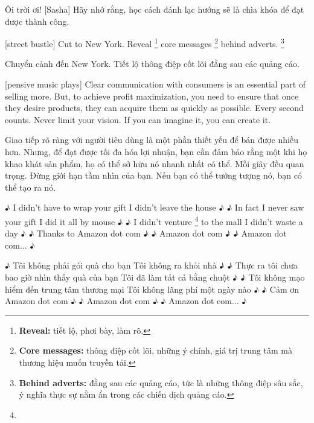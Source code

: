 \documentclass[a4paper]{article}
\begin{document}
	\begin{vietnamese-v2}
		 Ôi trời ơi! 
		[Sasha] Hãy nhớ rằng, học cách đánh lạc hướng sẽ là chìa khóa để đạt được thành công.
	\end{vietnamese-v2}
	
	
	[street bustle]
	Cut to New York. Reveal \footnote{
		\textbf{Reveal:} tiết lộ, phơi bày, làm rõ.
	
	} core messages \footnote{
		\textbf{Core messages:} thông điệp cốt lõi, những ý chính, giá trị trung tâm mà thương hiệu muốn truyền tải.
	
	} behind adverts. \footnote{
		\textbf{Behind adverts:} đằng sau các quảng cáo, tức là những thông điệp sâu sắc, ý nghĩa thực sự nằm ẩn trong các chiến dịch quảng cáo.
	
	}
	
	\begin{vietnamese-v2}
		Chuyển cảnh đến New York. Tiết lộ thông điệp cốt lõi đằng sau các quảng cáo.
	\end{vietnamese-v2}
	
	[pensive music plays]
	Clear communication with consumers is an essential part of selling more. But, to achieve profit maximization, you need to ensure that once they desire products, they can acquire them as quickly as possible.
	Every second counts.
	Never limit your vision.
	If you can imagine it, you can create it.
	
	\begin{vietnamese-v2}
		 Giao tiếp rõ ràng với người tiêu dùng là một phần thiết yếu để bán được nhiều hơn. Nhưng, để đạt được tối đa hóa lợi nhuận, bạn cần đảm bảo rằng một khi họ khao khát sản phẩm, họ có thể sở hữu nó nhanh nhất có thể. 
		Mỗi giây đều quan trọng. 
		Đừng giới hạn tầm nhìn của bạn. 
		Nếu bạn có thể tưởng tượng nó, bạn có thể tạo ra nó.
	\end{vietnamese-v2}
	
	
	♪ I didn't have to wrap your gift I didn't leave the house ♪
	♪ In fact I never saw your gift I did it all by mouse ♪
	♪ I didn't venture  \footnote{} to the mall I didn't waste a day ♪
	♪ Thanks to Amazon dot com ♪
	♪ Amazon dot com ♪
	♪ Amazon dot com... ♪
	
	\begin{vietnamese-v2}
		♪ Tôi không phải gói quà cho bạn Tôi không ra khỏi nhà ♪
		♪ Thực ra tôi chưa bao giờ nhìn thấy quà của bạn Tôi đã làm tất cả bằng chuột ♪
		♪ Tôi không mạo hiểm đến trung tâm thương mại Tôi không lãng phí một ngày nào ♪
		♪ Cảm ơn Amazon dot com ♪
		♪ Amazon dot com ♪
		♪ Amazon dot com... ♪
	\end{vietnamese-v2}
	
\end{document}
